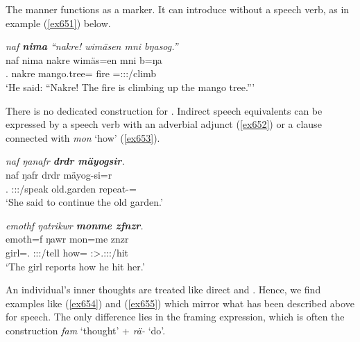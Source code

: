 The manner  functions as a  marker. It can introduce  without a speech verb, as in example (\ref{ex651}) below.

\begin{exe}
	\ex \emph{naf \textbf{nima} ``nakre! wimäsen mni bŋasog.''}\\
	\gll naf nima nakre wimäs=en mni b=ŋa\\
	\Tsg.\Erg{} \Quot{} nakre {mango.tree}=\Loc{} fire \Med=\Stsg:\Sbj:\Nonpast:\Ipfv/climb\\
	\trans `He said: ``Nakre! The fire is climbing up the mango tree.'''
	\label{ex651}
\end{exe}

There is no dedicated construction for . Indirect speech equivalents can be expressed by a speech verb with an adverbial adjunct (\ref{ex652}) or a clause connected with \emph{mon} `how' (\ref{ex653}).

\begin{exe}
	\ex \emph{naf ŋanafr \textbf{drdr mäyogsir}.}\\
	\gll naf ŋafr drdr mäyog-si=r\\
	\Tsg.\Erg{} \Stsg:\Sbj:\Nonpast:\Ipfv/speak old.garden repeat-\Nmlz=\Purp\\
	\trans `She said to continue the old garden.'
	\label{ex652}
\end{exe}
\begin{exe}
	\ex \emph{emothf ŋatrikwr \textbf{monme zfnzr}.}\\
	\gll emoth=f ŋawr mon=me znzr\\
	girl=\Erg.\Sg{} \Stsg:\Sbj:\Nonpast:\Ipfv/tell how=\Ins{} \Stsg:\Sbj>\Tsg.\F:\Obj:\Pst:\Ipfv/hit\\
	\trans `The girl reports how he hit her.'
	\label{ex653}
\end{exe}

An individual's inner thoughts are treated like direct and . Hence, we find examples like (\ref{ex654}) and (\ref{ex655}) which mirror what has been described above for speech. The only difference lies in the framing expression, which is often the  construction \emph{fam} `thought' + \emph{rä-} `do'.

